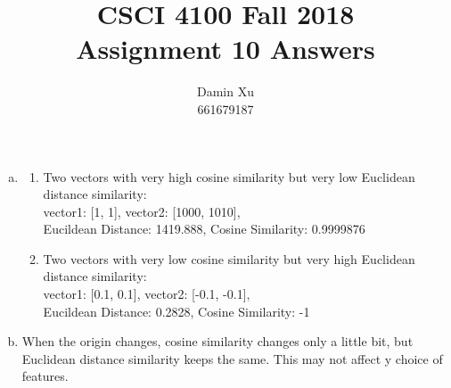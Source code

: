 \documentclass[11pt]{article}
\title{CSCI 4100 Fall 2018 \\
Assignment 10 Answers}
\author{Damin Xu\\661679187}
\begin{document}
\maketitle
\begin{enumerate} [(a)]
	\item \begin{enumerate} [1.]
		\item Two vectors with very high cosine similarity but very low Euclidean distance similarity:\\
		vector1: [1, 1], vector2: [1000, 1010],\\ Eucildean Distance: 1419.888, Cosine Similarity: 0.9999876
		\item Two vectors with very low cosine similarity but very high Euclidean distance similarity:\\
		vector1: [0.1, 0.1], vector2: [-0.1, -0.1],\\ Eucildean Distance: 0.2828, Cosine Similarity: -1
	\end{enumerate}
	\item When the origin changes, cosine similarity changes only a little bit, but Euclidean distance similarity keeps the same. This may not affect y choice of features.
\end{enumerate}
\end{document}
